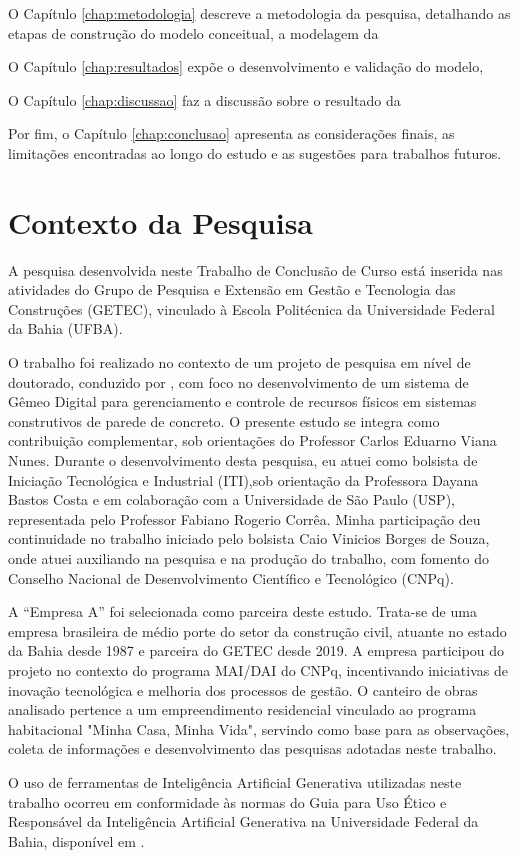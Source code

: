 O Capítulo \ref{chap:metodologia} descreve a metodologia da pesquisa, detalhando as etapas de construção do modelo conceitual, a modelagem da 

O Capítulo \ref{chap:resultados} expõe o desenvolvimento e validação do modelo,

O Capítulo \ref{chap:discussao} faz a discussão sobre o resultado da 

Por fim, o Capítulo \ref{chap:conclusao} apresenta as considerações finais, as limitações encontradas ao longo do estudo e as sugestões para trabalhos futuros.

\section{Contexto da Pesquisa}
A pesquisa desenvolvida neste Trabalho de Conclusão de Curso está inserida nas atividades do Grupo de Pesquisa e Extensão em Gestão e Tecnologia das Construções (GETEC), vinculado à Escola Politécnica da Universidade Federal da Bahia (UFBA).

O trabalho foi realizado no contexto de um projeto de pesquisa em nível de doutorado, conduzido por , com foco no desenvolvimento de um sistema de Gêmeo Digital para gerenciamento e controle de recursos físicos em sistemas construtivos de parede de concreto. O presente estudo se integra como contribuição complementar, sob orientações do Professor Carlos Eduarno Viana Nunes. Durante o desenvolvimento desta pesquisa, eu atuei como bolsista de Iniciação Tecnológica e Industrial (ITI),sob orientação da Professora Dayana Bastos Costa e em colaboração com a Universidade de São Paulo (USP), representada pelo Professor Fabiano Rogerio Corrêa. Minha participação deu continuidade no trabalho iniciado pelo bolsista Caio Vinicios Borges de Souza, onde atuei auxiliando na pesquisa e na produção do trabalho, com fomento do Conselho Nacional de Desenvolvimento Científico e Tecnológico (CNPq).

A “Empresa A” foi selecionada como parceira deste estudo. Trata-se de uma empresa brasileira de médio porte do setor da construção civil, atuante no estado da Bahia desde 1987 e parceira do GETEC desde 2019. A empresa participou do projeto no contexto do programa MAI/DAI do CNPq, incentivando iniciativas de inovação tecnológica e melhoria dos processos de gestão. O canteiro de obras analisado pertence a um empreendimento residencial vinculado ao programa habitacional "Minha Casa, Minha Vida", servindo como base para as observações, coleta de informações e desenvolvimento das pesquisas adotadas neste trabalho.

O uso de ferramentas de Inteligência Artificial Generativa utilizadas neste trabalho ocorreu em conformidade às normas do Guia para Uso Ético e
Responsável da Inteligência Artificial Generativa na
Universidade Federal da Bahia, disponível em \cite{ufba2025ia}.

